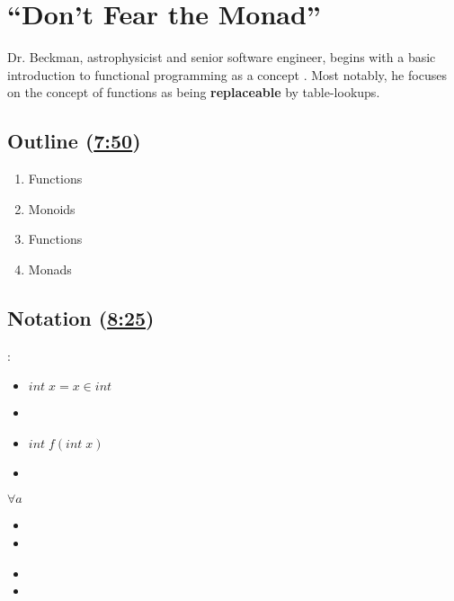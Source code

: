 \chapter{``Don't Fear the Monad''}

Dr. Beckman, astrophysicist and senior software engineer, begins with a basic
introduction to functional programming as a concept \autocite{beckman:monad}.
Most notably, he focuses on the concept of functions as being
\textbf{replaceable} by table-lookups.

\section{Outline (\href{https://youtu.be/ZhuHCtR3xq8?t=7m50s}{7:50})}

\begin{enumerate}
\item Functions
\item Monoids
\item Functions
\item Monads
\end{enumerate}

\section{Notation (\href{https://youtu.be/ZhuHCtR3xq8?t=7m50s}{8:25})}

\begin{description}[align=parleft,style=sameline,wide]
\item[From ``imperative'' to functional notation] :
  \begin{itemize}
  \item $int\;x= x \in int$
  \item {}
  \end{itemize}
  \begin{itemize}
  \item $int\;f(int\;x)$
  \item {}
  \end{itemize}
\item[Given type variable $a$ :] $\forall a$
  \begin{itemize}
  \item {}
  \item {}
  \end{itemize}
  \begin{itemize}
  \item {}
  \item {}
  \end{itemize}
\end{description}

